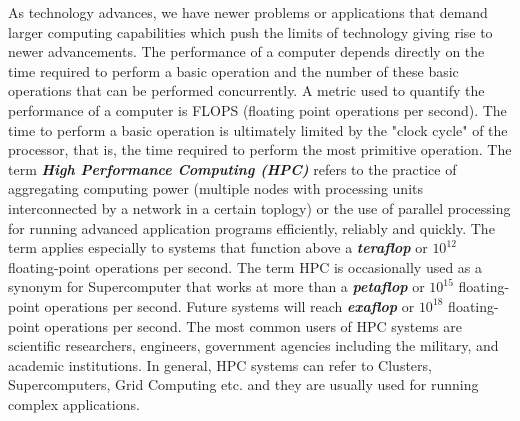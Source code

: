 As technology advances, we have newer problems or applications that demand larger computing capabilities which push the limits of technology giving rise to newer advancements. The performance of a computer depends directly on the time required to perform a basic operation and the number of these basic operations that can be performed concurrently. A metric used to quantify the performance of a computer is FLOPS (floating point operations per second). The time to perform a basic operation is ultimately limited by the "clock cycle" of the processor, that is, the time required to perform the most primitive operation. The term \textbf{\textit{High Performance Computing (HPC)}} refers to the practice of aggregating computing power (multiple nodes with processing units interconnected by a network in a certain toplogy) or the use of parallel processing for running advanced application programs efficiently, reliably and quickly. The term applies especially to systems that function above a \textbf{\textit{teraflop}} or \textbf{\textit{$10^{12}$}} floating-point operations per second. The term HPC is occasionally used as a synonym for Supercomputer that works at more than a \textbf{\textit{petaflop}} or \textbf{\textit{$10^{15}$}} floating-point operations per second. Future systems will reach \textbf{\textit{exaflop}} or \textbf{\textit{$10^{18}$}} floating-point operations per second. The most common users of HPC systems are scientific researchers, engineers, government agencies including the military, and academic institutions. In general, HPC systems can refer to Clusters, Supercomputers, Grid Computing etc. and they are usually used for running complex applications.\\ \par
\noindent
